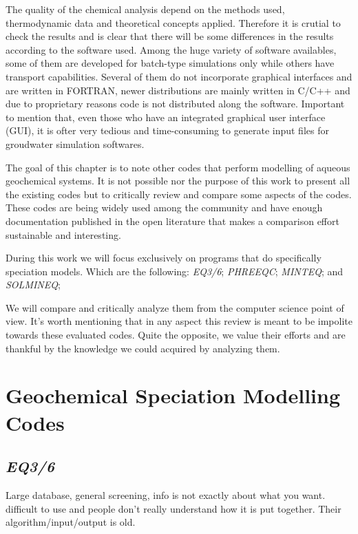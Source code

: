 \documentclass[ppgc,mestrado,english]{iiufrgs}
\begin{document}
The quality of the chemical analysis depend on the methods used, thermodynamic data and theoretical concepts applied. Therefore it is crutial to check the results and is clear that there will be some differences in the results according to the software used. Among the huge variety of software availables, some of them are developed for batch-type simulations only while others have transport capabilities. Several of them do not incorporate graphical interfaces and are written in FORTRAN, newer distributions are mainly written in C/C++ and due to proprietary reasons code is not distributed along the software. Important to mention that, even those who have an integrated graphical user interface (GUI), it is ofter very tedious and time-consuming to generate input files for groudwater simulation softwares.

The goal of this chapter is to note other codes that perform modelling of aqueous geochemical systems. It is not possible nor the purpose of this work to present all the existing codes but to critically review and compare some aspects of the codes. These codes are being widely used among the community and have enough documentation published in the open literature that makes a comparison effort sustainable and interesting.

During this work we will focus exclusively on programs that do specifically speciation models. Which are the following: \emph{EQ3/6}; \emph{PHREEQC}; \emph{MINTEQ}; and \emph{SOLMINEQ};

We will compare and critically analyze them from the computer science point of view. It's worth mentioning that in any aspect this review is meant to be impolite towards these evaluated codes. Quite the opposite, we value their efforts and are thankful by the knowledge we could acquired by analyzing them. 

\section{Geochemical Speciation Modelling Codes}
\subsection{\emph{EQ3/6}}
Large database, general screening, info is not exactly about what you want. difficult to use and people don't really understand how it is put together. Their algorithm/input/output is old. 
\end{document}
